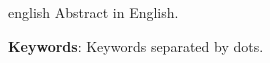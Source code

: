 \begin{resumo}[Abstract]
    \vspace{\onelineskip}
    \begin{otherlanguage*}{english}
    Abstract in English.

    \vspace{\onelineskip}
    \noindent\textbf{Keywords}: Keywords separated by dots.
    \end{otherlanguage*}
\end{resumo}
